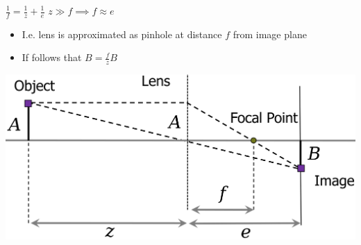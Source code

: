 \begin{itemize}
\begin{minipage}[b]{0.49\linewidth}
    \end{minipage}
     $\frac{1}{f} = \frac{1}{z} + \frac{1}{e}$
     $z \gg f \implies f \approx e$
        \begin{itemize}
            \item I.e. lens is approximated as pinhole at distance $f$ from image plane
            \item If follows that $B = \frac{f}{z}B$
        \end{itemize}
    \includegraphics[width=\linewidth]{./Figures/04_ThinLensEquation.png}
\end{itemize}

